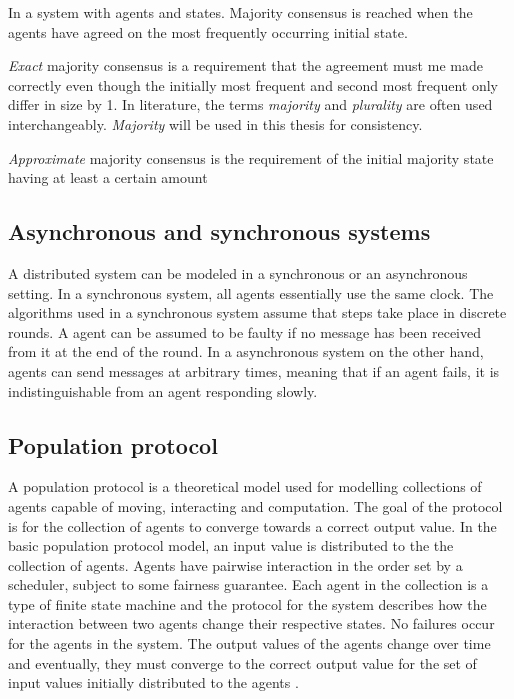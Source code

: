 \begin{definition}
In a system with  agents and  states. Majority consensus is reached when the agents have agreed on the most frequently occurring initial state. 
\end{definition}
 
 \emph{Exact} majority consensus is a requirement that the agreement must me made correctly even though the initially most frequent and second most frequent only differ in size by 1. In literature, the terms \emph{majority} and \emph{plurality} are often used interchangeably. \emph{Majority} will be used in this thesis for consistency.

\emph{Approximate} majority consensus is the requirement of the initial majority state having at least a certain amount 


\subsection{Asynchronous and synchronous systems}

A distributed system can be modeled in a synchronous or an asynchronous setting. In a synchronous system, all agents essentially use the same clock. The algorithms used in a synchronous system assume that steps take place in discrete rounds. A agent can be assumed to be faulty if no message has been received from it at the end of the round. In a asynchronous system on the other hand, agents can send messages at arbitrary times, meaning that if an agent fails, it is indistinguishable from an agent responding slowly.


\subsection{Population protocol}
 A population protocol is a theoretical model used for modelling collections of agents capable of moving, interacting and computation. The goal of the protocol is for the collection of agents to converge towards a correct output value. In the basic population protocol model, an input value is distributed to the the collection of agents. Agents have pairwise interaction in the order set by a scheduler, subject to some fairness guarantee. Each agent in the collection is a type of finite state machine and the protocol for the system describes how the interaction between two agents change their respective states. No failures occur for the agents in the system. The output values of the agents change over time and eventually, they must converge to the correct output value for the set of input values initially distributed to the agents \cite{aspnesIntroductionPopulationProtocols2009}. 

